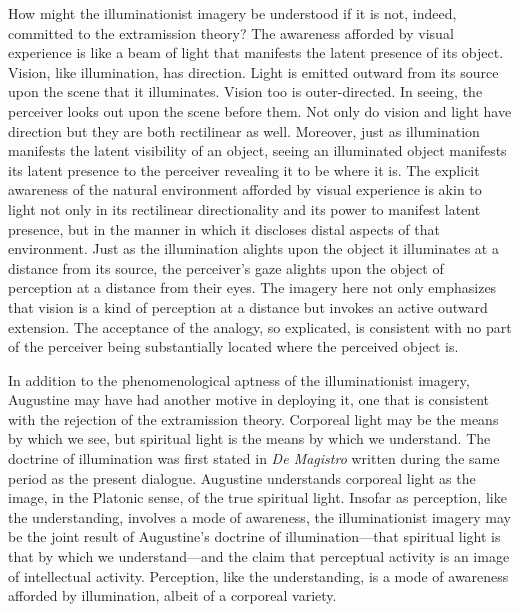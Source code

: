 \documentclass[12pt]{article}
\begin{document}
How might the illuminationist imagery be understood if it is not, indeed, committed to the extramission theory? The awareness afforded by visual experience is like a beam of light that manifests the latent presence of its object. Vision, like illumination, has direction. Light is emitted outward from its source upon the scene that it illuminates. Vision too is outer-directed. In seeing, the perceiver looks out upon the scene before them. Not only do vision and light have direction but they are both rectilinear as well. Moreover, just as illumination manifests the latent visibility of an object, seeing an illuminated object manifests its latent presence to the perceiver revealing it to be where it is. The explicit awareness of the natural environment afforded by visual experience is akin to light not only in its rectilinear directionality and its power to manifest latent presence, but in the manner in which it discloses distal aspects of that environment. Just as the illumination alights upon the object it illuminates at a distance from its source, the perceiver’s gaze alights upon the object of perception at a distance from their eyes. The imagery here not only emphasizes that vision is a kind of perception at a distance but invokes an active outward extension. The acceptance of the analogy, so explicated, is consistent with no part of the perceiver being substantially located where the perceived object is. 


In addition to the phenomenological aptness of the illuminationist imagery, Augustine may have had another motive in deploying it, one that is consistent with the rejection of the extramission theory. Corporeal light may be the means by which we see, but spiritual light is the means by which we understand. The doctrine of illumination was first stated in \emph{De Magistro} written during the same period as the present dialogue. Augustine understands corporeal light as the image, in the Platonic sense, of the true spiritual light.  Insofar as perception, like the understanding, involves a mode of awareness, the illuminationist imagery may be the joint result of Augustine's doctrine of illumination---that spiritual light is that by which we understand---and the claim that perceptual activity is an image of intellectual activity. Perception, like the understanding, is a mode of awareness afforded by illumination, albeit of a corporeal variety.
\end{document}
